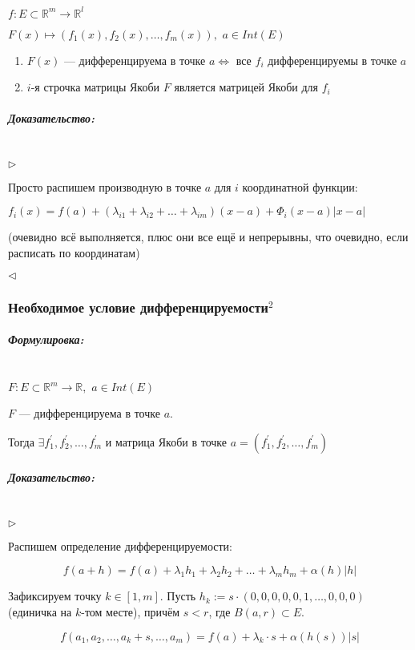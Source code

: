 \documentclass{article}
\def\dbl{\,\,}
\let\vanillasubparagraph\subparagraph
\renewcommand{\subparagraph}[1]{\vanillasubparagraph{#1}\mbox{}\\}
\begin{document}
$f: E \subset \mathbb{R}^m \rightarrow \mathbb{R}^l$

$F(x) \mapsto (f_1(x), f_2(x), \ldots, f_m(x)), \dbl a \in Int(E)$

\begin{enumerate}
    \item $F(x)$ --- дифференцируема в точке $a \Leftrightarrow$ все $f_i$ дифференцируемы в точке $a$
    
    \item $i$-я строчка матрицы Якоби $F$ является матрицей Якоби для $f_i$
\end{enumerate}

\subparagraph{Доказательство: }

$\rhd$

Просто распишем производную в точке $a$ для $i$ координатной функции:

$f_i(x) = f(a) + (\lambda_{i1} + \lambda_{i2} + \ldots + \lambda_{im}) (x - a) + \Phi_i(x - a)|x - a|$


(очевидно всё выполняется, плюс они все ещё и непрерывны, что очевидно, если расписать по координатам)

$\lhd$

\subsubsection{Необходимое условие дифференцируемости\texorpdfstring{$^2$}{}}

\subparagraph{Формулировка: }

$F: E \subset \mathbb{R}^m \rightarrow \mathbb{R}, \dbl a \in Int(E)$

$F$ --- дифференцируема в точке $a$.

Тогда $\exists f^\prime_1, f^\prime_2, \ldots, f^\prime_m$ и матрица Якоби в точке $a = (f^\prime_1, f^\prime_2, \ldots, f^\prime_m)$

\subparagraph{Доказательство: }

$\rhd$

Распишем определение дифференцируемости:

\[f(a + h) = f(a) + \lambda_1h_1 + \lambda_2h_2 + \ldots + \lambda_mh_m + \alpha(h)|h|\]

Зафиксируем точку $k \in [1, m]$. Пусть $h_k := s \cdot (0, 0, 0, 0, 0, 1, \ldots, 0, 0, 0)$ (единичка на $k$-том месте), причём $s < r$, где $B(a, r) \subset E$.

\[f(a_1, a_2, \ldots, a_k + s, \dots, a_m) = f(a) + \lambda_k \cdot s + \alpha(h(s))|s|\]
\end{document}
